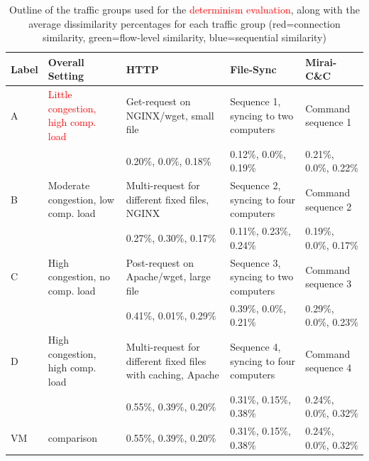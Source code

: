 \documentclass[sigconf]{acmart}
\begin{document}
\begin{table}
\centering
\begin{tabular}{p{0.8cm}|p{2.5cm}|p{2.7cm}|p{2.7cm}|p{2.7cm}}
Label &Overall Setting&HTTP&File-Sync & Mirai-C\&C\\ \hline
A&\textcolor{red}{Little congestion, high comp. load} & Get-request on NGINX/wget, small file & Sequence 1,  syncing to two computers & Command sequence 1 \\ \hline
 &&\footnotesize \textcolor{myred}{0.20\%}, \textcolor{mygreen}{0.0\%}, \textcolor{myblue}{0.18\%}&
 \footnotesize \textcolor{myred}{0.12\%}, \textcolor{mygreen}{0.0\%}, \textcolor{myblue}{0.19\%}&
 \footnotesize \textcolor{myred}{0.21\%}, \textcolor{mygreen}{0.0\%}, \textcolor{myblue}{0.22\%}\\ \hline \hline
B& Moderate congestion, low comp. load &Multi-request for different fixed files, NGINX & Sequence 2,  syncing to four computers & Command sequence 2\\ \hline
 &&\footnotesize \textcolor{myred}{0.27\%}, \textcolor{mygreen}{0.30\%}, \textcolor{myblue}{0.17\%}&
\footnotesize \textcolor{myred}{0.11\%}, \textcolor{mygreen}{0.23\%}, \textcolor{myblue}{0.24\%}&
\footnotesize \textcolor{myred}{0.19\%}, \textcolor{mygreen}{0.0\%}, \textcolor{myblue}{0.17\%}\\ \hline \hline
C& High congestion, no comp. load & Post-request on Apache/wget, large file &Sequence 3,  syncing to two computers & Command sequence 3\\ \hline
 &&\footnotesize \textcolor{myred}{0.41\%}, \textcolor{mygreen}{0.01\%}, \textcolor{myblue}{0.29\%}&
 \footnotesize \textcolor{myred}{0.39\%}, \textcolor{mygreen}{0.0\%}, \textcolor{myblue}{0.21\%}&
 \footnotesize \textcolor{myred}{0.29\%}, \textcolor{mygreen}{0.0\%}, \textcolor{myblue}{0.23\%}\\ \hline \hline
D& High congestion, high comp. load & Multi-request for different fixed files with caching, Apache & Sequence 4,  syncing to four computers & Command sequence 4\\ \hline
 &&\footnotesize \textcolor{myred}{0.55\%}, \textcolor{mygreen}{0.39\%}, \textcolor{myblue}{0.20\%}&
 \footnotesize \textcolor{myred}{0.31\%}, \textcolor{mygreen}{0.15\%}, \textcolor{myblue}{0.38\%}&
 \footnotesize \textcolor{myred}{0.24\%}, \textcolor{mygreen}{0.0\%}, \textcolor{myblue}{0.32\%}\\ \hline \hline
VM & comparison&\footnotesize \textcolor{myred}{0.55\%}, \textcolor{mygreen}{0.39\%}, \textcolor{myblue}{0.20\%}&
 \footnotesize \textcolor{myred}{0.31\%}, \textcolor{mygreen}{0.15\%}, \textcolor{myblue}{0.38\%}&
 \footnotesize \textcolor{myred}{0.24\%}, \textcolor{mygreen}{0.0\%}, \textcolor{myblue}{0.32\%}\\ \hline \hline
\end{tabular}
\caption{Outline of the traffic groups used for the \textcolor{red}{determinism evaluation}, along with the average dissimilarity percentages for each traffic group (red=connection similarity, green=flow-level similarity, blue=sequential similarity)}\label{Dataset}
\end{table}
\end{document}
